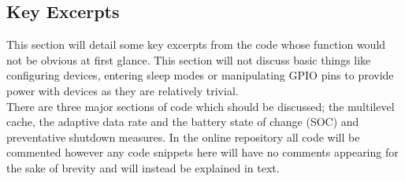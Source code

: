 \documentclass[12pt,openany,a4paper]{book}
\begin{document}
		\subsection{Key Excerpts}
		This section will detail some key excerpts from the code whose function would not be obvious at first glance. This section will not discuss basic things like configuring devices, entering sleep modes or manipulating GPIO pins to provide power with devices as they are relatively trivial. \\
		
		There are three major sections of code which should be discussed; the multilevel cache, the adaptive data rate and the battery state of change (SOC) and preventative shutdown measures. In the online repository all code will be commented however any code snippets here will have no comments appearing for the sake of brevity and will instead be explained in text. \\
\end{document}
